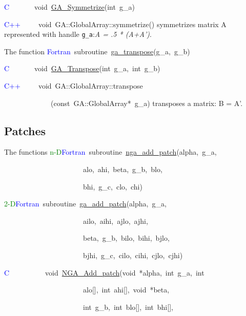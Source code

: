 \textcolor{blue}{C}~~~~~~~void~\href{http://www.emsl.pnl.gov/docs/global/c_nga_ops.html\#ga_symmetrize}{GA\_{}Symmetrize}(int~g\_a)~

\textcolor{blue}{C++}~~~~~void~GA::GlobalArray::symmetrize()
symmetrizes matrix A represented with handle \texttt{g\_a}:\emph{A
= .5 {*} (A+A')}.

The function
\textcolor{blue}{Fortran}~subroutine~\href{http://www.emsl.pnl.gov/docs/global/ga_ops.html\#ga_transpose}{ga\_{}transpose}(g\_a,~g\_b)~

\textcolor{blue}{C}~~~~~~~void~\href{http://www.emsl.pnl.gov/docs/global/c_nga_ops.html\#ga_transpose}{GA\_{}Transpose}(int~g\_a,~int~g\_b)~

\textcolor{blue}{C++}~~~~~void~GA::GlobalArray::transpose

~~~~~~~~~~~~~(const~GA::GlobalArray{*}~g\_a)
transposes a matrix: B = A'.


\subsection{Patches }

The functions
\textcolor{green}{n-D}\textcolor{blue}{Fortran}~subroutine~\href{http://www.emsl.pnl.gov/docs/global/ga_ops.html\#ga_add_patch}{nga\_{}add\_{}patch}(alpha,~g\_a,~

~~~~~~~~~~~~~~~~~~~~~~alo,~ahi,~beta,~g\_b,~blo,~

~~~~~~~~~~~~~~~~~~~~~~bhi,~g\_c,~clo,~chi)~

\textcolor{green}{2-D}\textcolor{blue}{Fortran}~subroutine~\href{http://www.emsl.pnl.gov/docs/global/ga_ops.html\#ga_add_patch}{ga\_{}add\_{}patch}(alpha,~g\_a,~

~~~~~~~~~~~~~~~~~~~~~~ailo,~aihi,~ajlo,~ajhi,~

~~~~~~~~~~~~~~~~~~~~~~beta,~g\_b,~bilo,~bihi,~bjlo,~

~~~~~~~~~~~~~~~~~~~~~~bjhi,~g\_c,~cilo,~cihi,~cjlo,~cjhi)~

\textcolor{blue}{C}~~~~~~~~~~void~\href{http://www.emsl.pnl.gov/docs/global/c_nga_ops.html\#ga_add_patch}{NGA\_{}Add\_{}patch}(void~{*}alpha,~int~g\_a,~int~

~~~~~~~~~~~~~~~~~~~~~~alo{[}{]},~int~ahi{[}{]},~void~{*}beta,~

~~~~~~~~~~~~~~~~~~~~~~int~g\_b,~int~blo{[}{]},~int~bhi{[}{]},~

